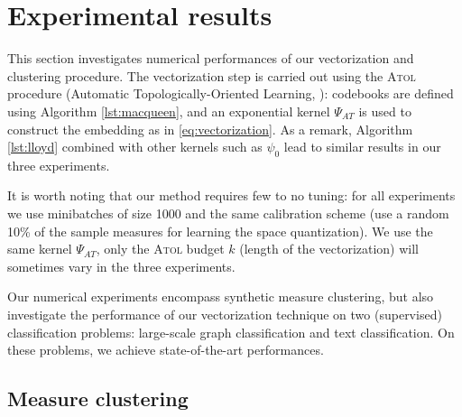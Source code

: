 \documentclass[noinfoline,preprint]{article}
\renewcommand{\1}{\mathds 1}
\begin{document}
\section{Experimental results}\label{sec:Expes}

This section investigates numerical performances of our vectorization and clustering procedure. The vectorization step is carried out using  the \textsc{Atol} procedure (Automatic Topologically-Oriented Learning, \cite{Royer19}): codebooks are defined using Algorithm \ref{lst:macqueen}, and an exponential kernel $\Psi_{AT}$ is used to construct the embedding as in \eqref{eq:vectorization}.  As a remark, Algorithm \ref{lst:lloyd} combined with other kernels such as $\psi_0$ lead to similar results in our three experiments.

It is worth noting that our method requires few to no tuning: for all experiments we use minibatches of size 1000 and the same calibration scheme (use a random 10\% of the sample measures for learning the space quantization). We use the same kernel $\Psi_{AT}$, only the \textsc{Atol} budget $k$ (length of the vectorization) will sometimes vary in the three experiments. 

Our numerical experiments encompass synthetic measure clustering, but also investigate the performance of our vectorization technique on two (supervised) classification problems: large-scale graph classification and text classification. On these problems, we achieve state-of-the-art performances.


\subsection{Measure clustering}
\end{document}
